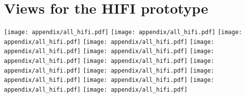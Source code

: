 \section{Views for the HIFI prototype}
\texttt{[image: appendix/all\_hifi.pdf]}
\texttt{[image: appendix/all\_hifi.pdf]}
\texttt{[image: appendix/all\_hifi.pdf]}
\texttt{[image: appendix/all\_hifi.pdf]}
\texttt{[image: appendix/all\_hifi.pdf]}
\texttt{[image: appendix/all\_hifi.pdf]}
\texttt{[image: appendix/all\_hifi.pdf]}
\texttt{[image: appendix/all\_hifi.pdf]}
\texttt{[image: appendix/all\_hifi.pdf]}
\texttt{[image: appendix/all\_hifi.pdf]}
\texttt{[image: appendix/all\_hifi.pdf]}
\texttt{[image: appendix/all\_hifi.pdf]}
\texttt{[image: appendix/all\_hifi.pdf]}
\texttt{[image: appendix/all\_hifi.pdf]}
